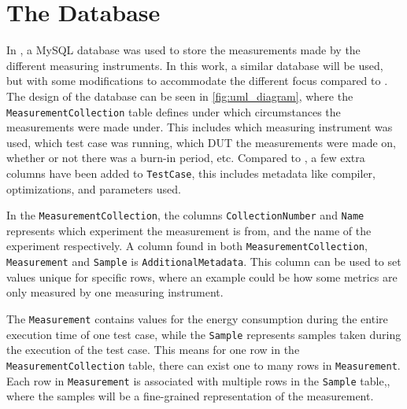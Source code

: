 \section{The Database}\label{app:database}

In \cite{biksbois}, a MySQL database was used to store the measurements made by the different measuring instruments. In this work, a similar database will be used, but with some modifications to accommodate the different focus compared to \cite{biksbois}. The design of the database can be seen in \cref{fig:uml_diagram}, where the \texttt{MeasurementCollection} table defines under which circumstances the measurements were made under. This includes which measuring instrument was used, which test case was running, which DUT the measurements were made on, whether or not there was a burn-in period, etc. Compared to \cite{biksbois}, a few extra columns have been added to \texttt{TestCase}, this includes metadata like compiler, optimizations, and parameters used.


In the \texttt{MeasurementCollection}, the columns \texttt{CollectionNumber} and \texttt{Name} represents which experiment the measurement is from, and the name of the experiment respectively. A column found in both \texttt{MeasurementCollection}, \texttt{Measurement} and \texttt{Sample} is \texttt{AdditionalMetadata}. This column can be used to set values unique for specific rows, where an example could be how some metrics are only measured by one measuring instrument.



The \texttt{Measurement} contains values for the energy consumption during the entire execution time of one test case, while the \texttt{Sample} represents samples taken during the execution of the test case. This means for one row in the \texttt{MeasurementCollection} table, there can exist one to many rows in \texttt{Measurement}. Each row in \texttt{Measurement} is associated with multiple rows in the \texttt{Sample} table,, where the samples will be a fine-grained representation of the measurement.


